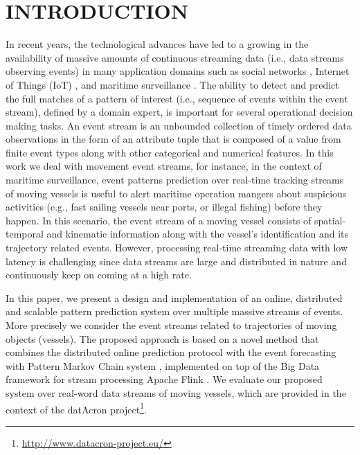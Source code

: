 \section{INTRODUCTION}


In recent years, the technological advances have led to a growing in the availability of massive amounts of continuous streaming data (i.e., data streams observing events) in many application domains such as social networks \cite{mathioudakis2010twittermonitor}, Internet of Things (IoT) \cite{miorandi2012internet}, and maritime surveillance \cite{patroumpas2015event}.  The ability to detect and predict the full matches of a pattern of interest (i.e., sequence of events within the event stream), defined by a domain expert, is important for several operational decision making tasks.
An event stream is an unbounded collection of timely ordered data observations in the form of an attribute tuple that is composed of a value from finite event types along with other categorical and numerical features. In this work we deal with movement event streams, for instance, in the context of maritime surveillance, event patterns prediction over real-time tracking streams of moving vessels is useful to alert maritime operation mangers about suspicious activities (e.g., fast sailing vessels near ports, or illegal fishing) before they happen. In this scenario, the event stream of a moving vessel consists of spatial-temporal and kinematic information along with the vessel's identification and its trajectory related events. However, processing real-time streaming data with low latency is challenging since data streams are large and distributed in nature and continuously keep on coming at a high rate. 
\par In this paper, we present a design and implementation of an online, distributed and scalable pattern prediction system over multiple massive streams of events. More precisely we consider the event streams related to trajectories of moving objects (vessels). The proposed approach is based on a novel method that combines the distributed online prediction protocol \cite{dekel2012optimal,kamp2014communication} with the event forecasting with Pattern Markov Chain system \cite{alevizos2017event}, implemented on top of the Big Data framework for stream processing Apache Flink \cite{Flink}. We evaluate our proposed system over  real-word data streams of moving vessels, which are provided in the context of the datAcron project\footnote{\url{http://www.datacron-project.eu/}}.